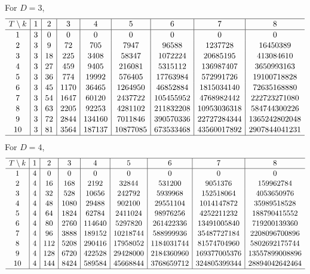 \documentclass[pdftex]{sigma}
\numberwithin{equation}{section}
\begin{document}
For $D=3$,
\begin{gather*}
\setlength{\tabcolsep}{4.5pt}
\renewcommand{\arraystretch}{1.1}
\begin{tabular}{c|c|c|c|c|c|c|c|c}
\hline $T\setminus k$&1&2&3&4&5&6&7&8\\ \hline
1&3& 0& 0& 0& 0& 0& 0& 0\\
2&3& 9& 72& 705& 7947& 96588& 1237728& 16450389\\
3&3& 18& 225& 3408& 58347& 1072224& 20685195& 413084610\\
4&3& 27& 459& 9405& 216081& 5315112& 136987407& 3650993163\\
5&3& 36& 774& 19992& 576405& 17763984& 572991726& 19100718828\\
6&3& 45& 1170& 36465& 1264950& 46852884& 1815034140& 72635168880\\
7&3& 54& 1647& 60120& 2437722& 105455952& 4768982442& 222723271080\\
8&3& 63& 2205& 92253& 4281102& 211832208& 10953036318& 584744300226\\
9&3& 72& 2844& 134160& 7011846& 390570336& 22727284344& 1365242802048\\
10&3& 81& 3564& 187137& 10877085& 673533468& 43560017892& 2907844041231\\
\hline\end{tabular}\end{gather*}
For $D=4$,
\begin{gather*}
\setlength{\tabcolsep}{4.5pt}
\renewcommand{\arraystretch}{1.1}
\begin{tabular}{c|c|c|c|c|c|c|c|c}
\hline $T\setminus k$&1&2&3&4&5&6&7&8\\ \hline
1&4& 0& 0& 0& 0& 0& 0& 0\\
2&4& 16& 168& 2192& 32844& 531200& 9051376& 159962784\\
3&4& 32& 528& 10656& 242792& 5939968& 152518064& 4053650976\\
4&4& 48& 1080& 29488& 902100& 29551104& 1014147872& 35989518528\\
5&4& 64& 1824& 62784& 2411024& 98976256& 4252211232& 188790415552\\
6&4& 80& 2760& 114640& 5297820& 261422336& 13491005840& 719200139360\\
7&4& 96& 3888& 189152& 10218744& 588999936& 35487727184& 2208096700896\\
8&4& 112& 5208& 290416& 17958052& 1184031744& 81574704960& 5802692175744\\
9&4& 128& 6720& 422528& 29428000& 2184360960& 169377005376& 13557899008896\\
10&4& 144& 8424& 589584& 45668844& 3768659712& 324805399344& 28894042642464\\
\hline
\end{tabular}
\end{gather*}
\end{document}
